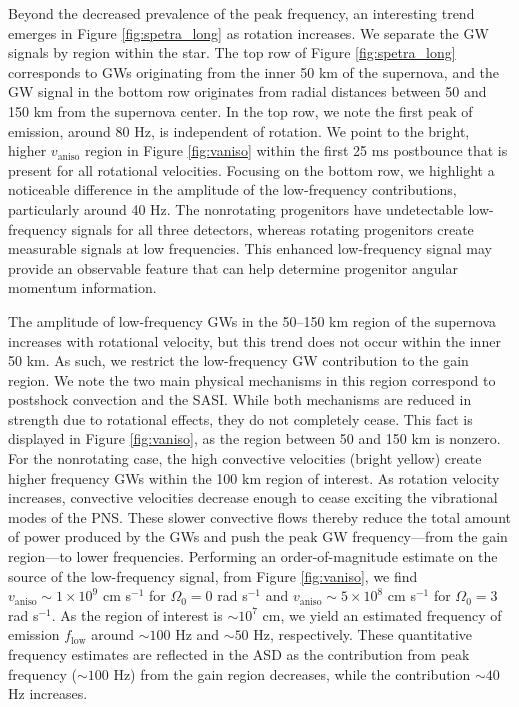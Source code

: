 \documentclass[twocolumn,times]{aastex62}  %
\begin{document}
Beyond the decreased prevalence of the peak frequency, an interesting trend emerges in Figure \ref{fig:spetra_long} as rotation increases.  
We separate the GW signals by region within the star.  The top row of Figure \ref{fig:spetra_long} corresponds to GWs originating from the inner 50 km of the supernova, and the GW signal in the bottom row originates from radial distances between 50 and 150 km from the supernova center.  In the top row, we note the first peak of emission, around 80 Hz, is independent of rotation.  We point to the bright, higher $v_\mathrm{aniso}$ region in Figure \ref{fig:vaniso} within the first 25 ms postbounce that is present for all rotational velocities.
Focusing on the bottom row, we highlight a noticeable difference in the amplitude of the low-frequency contributions, particularly around 40 Hz.  The nonrotating progenitors have undetectable low-frequency signals for all three detectors, whereas rotating progenitors create measurable signals at low frequencies. 
This enhanced low-frequency signal may provide an observable feature that can help determine progenitor angular momentum information.  

The amplitude of low-frequency GWs in the 50--150 km region of the supernova increases with rotational velocity, but this trend does not occur within the inner 50 km.  As such, we restrict the low-frequency GW contribution to the gain region.  We note the two main physical mechanisms in this region correspond to postshock convection and the SASI.  While both mechanisms are reduced in strength due to rotational effects, they do not completely cease.  This fact is displayed in Figure \ref{fig:vaniso}, as the region between 50 and 150 km is nonzero.  For the nonrotating case, the high convective velocities (bright yellow) create higher frequency GWs within the 100 km region of interest.  As rotation velocity increases, convective velocities decrease enough to cease exciting the vibrational modes of the PNS.  These slower convective flows thereby reduce the total amount of power produced by the GWs and push the peak GW frequency---from the gain region---to lower frequencies.  Performing an order-of-magnitude estimate on the source of the low-frequency signal, from Figure \ref{fig:vaniso}, we find  $v_{\mathrm{aniso}} \sim 1 \times 10^9$ cm s$^{-1}$ for $\Omega_0 = 0$ rad s$^{-1}$ and $v_{\mathrm{aniso}} \sim 5 \times 10^8$ cm s$^{-1}$ for $\Omega_0 = 3$ rad s$^{-1}$.  As the region of interest is $\sim 10^7$ cm, we yield an estimated frequency of emission $f_{\mathrm{low}}$ around $\sim 100$ Hz and $\sim 50$ Hz, respectively.  These quantitative frequency estimates are reflected in the ASD as the contribution from peak frequency ($\sim 100$ Hz) from the gain region decreases, while the contribution $\sim 40$ Hz increases.
\end{document}
